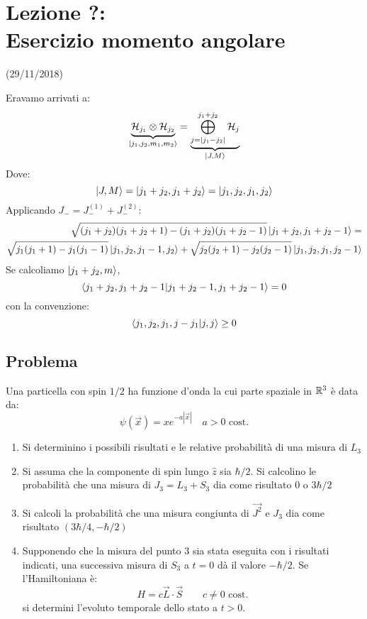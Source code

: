 \documentclass[../../FisicaTeorica.tex]{subfiles}
\begin{document}
\section{Lezione ?:\\ \large{Esercizio momento angolare}}
\vspace{-1em}
\begin{center}
    \small{(29/11/2018)}
\end{center}

Eravamo arrivati a:
\[
\underbrace{\mathcal{H}_{j_1} \otimes \mathcal{H}_{j_2}}_{\ket{j_1, j_2, m_1, m_2}} = \underbrace{\bigoplus_{j=|j_1-j_2|}^{j_1+j_2}\mathcal{H}_j}_{\ket{J, M}}
\]
Dove:
\[
\ket{J, M}=\ket{j_1+j_2, j_1+j_2}=\ket{j_1, j_2, j_1, j_2}
\]
Applicando $J_- = J_-^{(1)}+J_-^{(2)}$:
\begin{align*}
\sqrt{(j_1+j_2)(j_1+j_2+1)-(j_1+j_2)(j_1+j_2-1)}\ket{j_1+j_2, j_1+j_2-1} = \\
\sqrt{j_1(j_1+1)-j_1(j_1-1)}\ket{j_1, j_2, j_1-1, j_2}+
\sqrt{j_2(j_2+1)-j_2(j_2-1)}\ket{j_1, j_2, j_1, j_2 -1}
\end{align*}
Se calcoliamo $\ket{j_1+j_2, m}$, 
\[
\braket{j_1+j_2, j_1+j_2-1|j_1+j_2-1, j_1+j_2-1}=0
\]
con la convenzione:
\[
\braket{j_1, j_2, j_1, j-j_1|j,j}\geq 0
\]

\subsection{Problema}
Una particella con spin $1/2$ ha funzione d'onda la cui parte spaziale in $\mathbb{R}^3$ è data da:
\[
\psi(\vec{x})=xe^{-a|\vec{x}|}\quad a>0 \text{ cost.}
\]
\begin{enumerate}
\item Si determinino i possibili risultati e le relative probabilità di una misura di $L_3$
\item Si assuma che la componente di spin lungo $\hat{z}$ sia $\hbar/2$. Si calcolino le probabilità che una misura di $J_3 = L_3 + S_3$ dia come risultato $0$ o $3\hbar/2$
\item Si calcoli la probabilità che una misura congiunta di $\vec{J^2}$ e $J_3$ dia come risultato $(3\hbar/4, -\hbar/2)$
\item Supponendo che la misura del punto $3$ sia stata eseguita con i risultati indicati, una successiva misura di $S_3$ a $t=0$ dà il valore $-\hbar/2$. Se l'Hamiltoniana è:
\[
H=c\vec{L}\cdot \vec{S} \qquad c \neq 0\text{ cost.}
\]
si determini l'evoluto temporale dello stato a $t>0$.
\end{enumerate}
\end{document}
